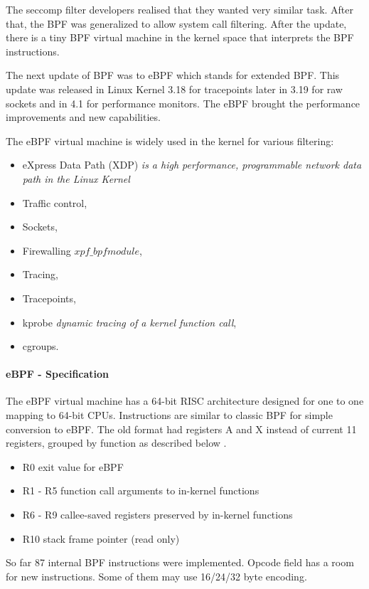 The seccomp filter developers realised that they wanted very similar task.
After that, the BPF was generalized to allow system call filtering.
After the update, there is a tiny BPF virtual machine in the kernel space that interprets the BPF instructions.

The next update of BPF was to eBPF which stands for extended BPF.
This update was released in Linux Kernel 3.18 for tracepoints later in 3.19 for raw sockets and in 4.1 for performance monitors.
The eBPF brought the performance improvements and new capabilities.

The eBPF virtual machine is widely used in the kernel for various filtering:
\begin{itemize}
	\item eXpress Data Path (XDP) \textit{is a high performance, programmable network data path in the Linux Kernel}
    \item Traffic control,
    \item Sockets,
    \item Firewalling \textit{\(xpf\_bpf module\)},
    \item Tracing,
    \item Tracepoints,
    \item kprobe \textit{dynamic tracing of a kernel function call},
    \item cgroups.
\end{itemize}

\paragraph{eBPF - Specification}
The eBPF virtual machine has a 64-bit RISC architecture designed for one to one mapping to 64-bit CPUs.
Instructions are similar to classic BPF for simple conversion to eBPF.
The old format had registers A and X instead of current 11 registers, grouped by function as described below \cite{kernel_bpf_specification}.
\pagebreak
\begin{itemize}
	\item R0 exit value for eBPF
	\item R1 - R5 function call arguments to in-kernel functions
	\item R6 - R9 callee-saved registers preserved by in-kernel functions
	\item R10 stack frame pointer (read only)
\end{itemize}

So far 87 internal BPF instructions were implemented.
Opcode field has a room for new instructions.
Some of them may use 16/24/32 byte encoding.


